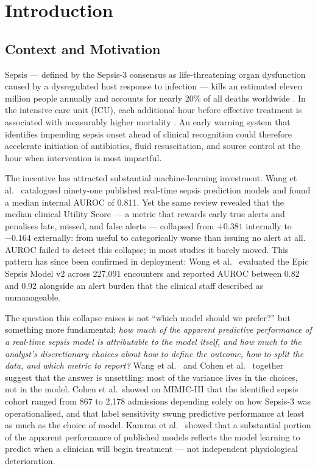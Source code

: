 \chapter{Introduction}
\label{ch:introduction}

\section{Context and Motivation}

Sepsis --- defined by the Sepsis-3 consensus as life-threatening organ dysfunction
caused by a dysregulated host response to infection \parencite{singer2016sepsis3}
--- kills an estimated eleven million people annually and accounts for nearly
20\% of all deaths worldwide \parencite{rudd2020global}. In the intensive care
unit (ICU), each additional hour before effective treatment is associated with
measurably higher mortality \parencite{seymour2017time}. An early warning system
that identifies impending sepsis onset ahead of clinical recognition could
therefore accelerate initiation of antibiotics, fluid resuscitation, and source
control at the hour when intervention is most impactful.

The incentive has attracted substantial machine-learning investment. Wang et al.\
\parencite{wang2025srpm} catalogued ninety-one published real-time sepsis
prediction models and found a median internal AUROC of 0.811. Yet the same
review revealed that the median clinical Utility Score --- a metric that rewards
early true alerts and penalises late, missed, and false alerts --- collapsed from
$+0.381$ internally to $-0.164$ externally: from useful to categorically worse
than issuing no alert at all. AUROC failed to detect this collapse; in most
studies it barely moved. This pattern has since been confirmed in deployment:
Wong et al.\ \parencite{wong2026epic} evaluated the Epic Sepsis Model v2 across
227{,}091 encounters and reported AUROC between 0.82 and 0.92 alongside an alert
burden that the clinical staff described as unmanageable.

The question this collapse raises is not ``which model should we prefer?'' but
something more fundamental: \textit{how much of the apparent predictive performance
of a real-time sepsis model is attributable to the model itself, and how much to
the analyst's discretionary choices about how to define the outcome, how to split
the data, and which metric to report?} Wang et al.\ \parencite{wang2025srpm}
and Cohen et al.\ \parencite{cohen2024subtle} together suggest that the answer
is unsettling: most of the variance lives in the choices, not in the model.
Cohen et al.\ showed on MIMIC-III that the identified sepsis cohort ranged from
867 to 2{,}178 admissions depending solely on how Sepsis-3 was operationalised,
and that label sensitivity swung predictive performance at least as much as the
choice of model. Kamran et al.\ \parencite{kamran2024evaluation} showed that a
substantial portion of the apparent performance of published models reflects
the model learning to predict when a clinician will begin treatment ---
not independent physiological deterioration.

